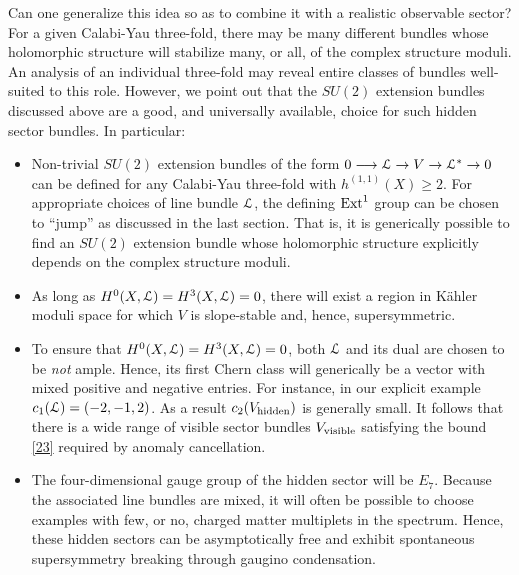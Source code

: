 \documentclass[12pt]{article}
\numberwithin{equation}{section}
\begin{document}
Can one generalize this idea so as to combine it with a realistic observable sector? For a given Calabi-Yau three-fold, there may be many different bundles whose holomorphic structure will stabilize many, or all, of the complex structure moduli. An analysis of an individual three-fold may reveal entire classes of bundles well-suited to this role. However, we point out that the $SU(2)$ extension bundles discussed above are a good, and universally available, choice for such hidden sector bundles. In particular:

\begin{itemize}

\item Non-trivial $SU(2)$ extension bundles of the form $0 \longrightarrow {\cal{L}} \rightarrow V \rightarrow {\cal{L}}^{*} \rightarrow 0$ can be defined for any Calabi-Yau three-fold with 
$h^{(1,1)}(X) \geq 2$. For appropriate choices of line bundle $ {\cal{L}}$, the defining ${\rm Ext}^{1}$ group can be chosen to ``jump'' as discussed in the last section. That is, it is generically possible to find an $SU(2)$ extension bundle whose holomorphic structure explicitly depends on the complex structure moduli.

\item As long as $H^{0}(X,{\cal{L}})=H^{3}(X,{\cal{L}})=0$, there will exist a region in K\"ahler moduli space for which $V$ is slope-stable \cite{big_paper} and, hence, supersymmetric.

\item To ensure that $H^{0}(X,{\cal{L}})=H^{3}(X,{\cal{L}})=0$, both ${\cal{L}}$ and its dual are chosen to be {\it not} ample. Hence, its first Chern class will generically be a vector with mixed positive and negative entries. For instance, in our explicit example $c_{1}({\cal{L}})=(-2,-1,2)$. As a result $c_{2}(V_{\rm hidden})$ is generally small. It follows that there is a wide range of visible sector bundles $V_{\rm visible}$ satisfying the bound \eqref{23} required by anomaly cancellation.

\item The four-dimensional gauge group of the hidden sector will be $E_{7}$. Because the associated line bundles are mixed, it will often be possible to choose examples with few, or no, charged matter multiplets in the spectrum. Hence, these hidden sectors can be asymptotically free and exhibit spontaneous supersymmetry breaking through gaugino condensation.

\end{itemize}
\end{document}
